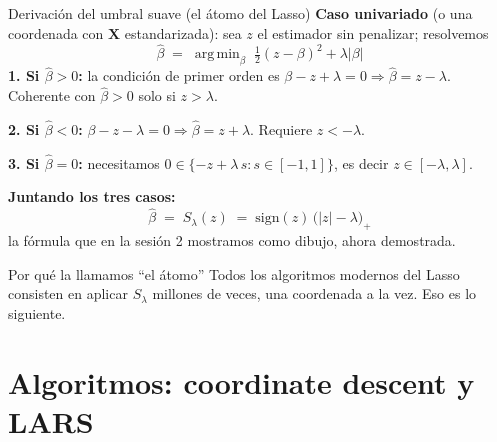 \documentclass{beamer}
\newcommand{\1}{\mathbb{I}}
\newcommand{\sign}{\mathrm{sign}}
\DeclareMathOperator*{\argmin}{arg\,min}
\begin{document}
\begin{frame}{Derivación del umbral suave (el átomo del Lasso)}
\small
\textbf{Caso univariado} (o una coordenada con $\mathbf{X}$ estandarizada): sea $z$ el estimador sin penalizar; resolvemos
\[ \hat{\beta} \;=\; \argmin_{\beta} \; \tfrac{1}{2}(z - \beta)^2 + \lambda |\beta| \]
\pause
\textbf{1. Si $\hat{\beta} > 0$:} la condición de primer orden es $\beta - z + \lambda = 0 \Rightarrow \hat{\beta} = z - \lambda$. \\
Coherente con $\hat{\beta} > 0$ solo si $z > \lambda$.
\pause

\textbf{2. Si $\hat{\beta} < 0$:} $\beta - z - \lambda = 0 \Rightarrow \hat{\beta} = z + \lambda$. Requiere $z < -\lambda$.
\pause

\textbf{3. Si $\hat{\beta} = 0$:} necesitamos $0 \in \{-z + \lambda\, s : s \in [-1,1]\}$, es decir $z \in [-\lambda, \lambda]$.
\pause

\vspace{0.15cm}
\textbf{Juntando los tres casos:}
\[ \boxed{ \; \hat{\beta} \;=\; S_{\lambda}(z) \;=\; \sign(z)\,\big(|z| - \lambda\big)_{+} \; } \]
la fórmula que en la sesión 2 mostramos como dibujo, ahora demostrada.
\pause

\begin{block}{Por qué la llamamos ``el átomo''}
Todos los algoritmos modernos del Lasso consisten en aplicar $S_\lambda$ millones de veces, una coordenada a la vez. Eso es lo siguiente.
\end{block}
\end{frame}


\section{Algoritmos: coordinate descent y LARS}
\begin{frame}[noframenumbering]
\tableofcontents[currentsection]
\end{frame}
\end{document}
